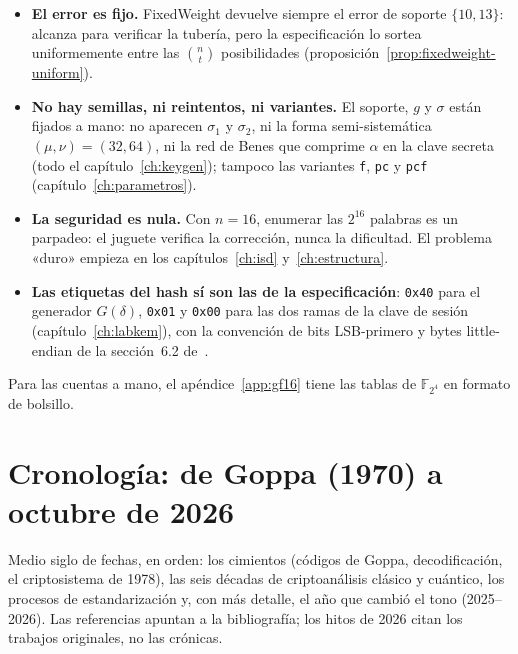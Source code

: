 \documentclass[11pt,a4paper,oneside]{report}
\newcommand{\F}{\mathbb{F}}
\newcommand{\FF}[1]{\F_{2^{#1}}}
\begin{document}
\begin{itemize}[leftmargin=1.5em,itemsep=3pt]
  \item \textbf{El error es fijo.} \textsf{FixedWeight} devuelve
        siempre el error de soporte $\{10,13\}$: alcanza para
        verificar la tubería, pero la especificación lo sortea
        uniformemente entre las $\binom{n}{t}$ posibilidades
        (proposición~\ref{prop:fixedweight-uniform}).
  \item \textbf{No hay semillas, ni reintentos, ni variantes.} El
        soporte, $g$ y $\sigma$ están fijados a mano: no aparecen
        $\sigma_1$ y $\sigma_2$, ni la forma semi-sistemática
        $(\mu,\nu)=(32,64)$, ni la red de Benes que comprime
        $\alpha$ en la clave secreta (todo el
        capítulo~\ref{ch:keygen}); tampoco las variantes
        \texttt{f}, \texttt{pc} y \texttt{pcf}
        (capítulo~\ref{ch:parametros}).
  \item \textbf{La seguridad es nula.} Con $n=16$, enumerar las
        $2^{16}$ palabras es un parpadeo: el juguete verifica la
        corrección, nunca la dificultad. El problema «duro» empieza
        en los capítulos~\ref{ch:isd} y~\ref{ch:estructura}.
  \item \textbf{Las etiquetas del hash sí son las de la
        especificación}: \texttt{0x40} para el generador
        $G(\delta)$, \texttt{0x01} y \texttt{0x00} para las dos
        ramas de la clave de sesión (capítulo~\ref{ch:labkem}), con
        la convención de bits LSB-primero y bytes little-endian de
        la sección~6.2 de~\cite{cmspec}.
\end{itemize}

\medskip
\noindent Para las cuentas a mano, el apéndice~\ref{app:gf16} tiene
las tablas de $\FF4$ en formato de bolsillo.


\chapter{Cronología: de Goppa (1970) a octubre de 2026}\label{app:cronologia}

\begin{roadmap}
Medio siglo de fechas, en orden: los cimientos (códigos de Goppa,
decodificación, el criptosistema de 1978), las seis décadas de
criptoanálisis clásico y cuántico, los procesos de estandarización y,
con más detalle, el año que cambió el tono (2025--2026). Las
referencias apuntan a la bibliografía; los hitos de 2026 citan los
trabajos originales, no las crónicas.
\end{roadmap}
\end{document}
